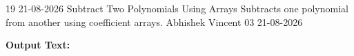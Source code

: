 \clearpage
\label{prog:19}
\programhead
  {19}
  {21-08-2026}
  {Subtract Two Polynomials Using Arrays}
  {Subtracts one polynomial from another using coefficient arrays.}
  {Abhishek Vincent}
  {03}
  {21-08-2026}

\divider
\textbf{Output Text:}\par
\vspace{2pt}

